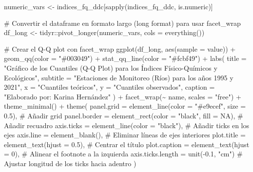 \documentclass[
  10pt,
  letterpaper,
  DIV=11,
  numbers=noendperiod]{scrreprt}
\newenvironment{Shaded}{\begin{snugshade}}{\end{snugshade}}
\newcommand{\AttributeTok}[1]{\textcolor[rgb]{0.40,0.45,0.13}{#1}}
\newcommand{\CommentTok}[1]{\textcolor[rgb]{0.37,0.37,0.37}{#1}}
\newcommand{\ConstantTok}[1]{\textcolor[rgb]{0.56,0.35,0.01}{#1}}
\newcommand{\DecValTok}[1]{\textcolor[rgb]{0.68,0.00,0.00}{#1}}
\newcommand{\FloatTok}[1]{\textcolor[rgb]{0.68,0.00,0.00}{#1}}
\newcommand{\FunctionTok}[1]{\textcolor[rgb]{0.28,0.35,0.67}{#1}}
\newcommand{\NormalTok}[1]{\textcolor[rgb]{0.00,0.23,0.31}{#1}}
\newcommand{\OtherTok}[1]{\textcolor[rgb]{0.00,0.23,0.31}{#1}}
\newcommand{\SpecialCharTok}[1]{\textcolor[rgb]{0.37,0.37,0.37}{#1}}
\newcommand{\StringTok}[1]{\textcolor[rgb]{0.13,0.47,0.30}{#1}}
\begin{document}
\begin{Shaded}
\begin{Highlighting}[numbers=left,,]
\NormalTok{numeric\_vars }\OtherTok{\textless{}{-}}\NormalTok{ indices\_fq\_ddc[}\FunctionTok{sapply}\NormalTok{(indices\_fq\_ddc, is.numeric)]}

\CommentTok{\# Convertir el dataframe en formato largo (long format) para usar facet\_wrap}
\NormalTok{df\_long }\OtherTok{\textless{}{-}}\NormalTok{ tidyr}\SpecialCharTok{::}\FunctionTok{pivot\_longer}\NormalTok{(numeric\_vars, }\AttributeTok{cols =} \FunctionTok{everything}\NormalTok{())}

\CommentTok{\# Crear el Q{-}Q plot con facet\_wrap}
\FunctionTok{ggplot}\NormalTok{(df\_long, }\FunctionTok{aes}\NormalTok{(}\AttributeTok{sample =}\NormalTok{ value)) }\SpecialCharTok{+}
    \FunctionTok{geom\_qq}\NormalTok{(}\AttributeTok{color =} \StringTok{"\#003049"}\NormalTok{) }\SpecialCharTok{+}
    \FunctionTok{stat\_qq\_line}\NormalTok{(}\AttributeTok{color =} \StringTok{"\#fcbf49"}\NormalTok{) }\SpecialCharTok{+}
    \FunctionTok{labs}\NormalTok{(}
        \AttributeTok{title =} \StringTok{"Gráfico de los Cuantiles (Q{-}Q Plot) para los Índices Físico{-}Químicos y Ecológicos"}\NormalTok{,}
        \AttributeTok{subtitle =} \StringTok{"Estaciones de Monitoreo (Ríos) para los años 1995 y 2021"}\NormalTok{,}
        \AttributeTok{x =} \StringTok{"Cuantiles teóricos"}\NormalTok{,}
        \AttributeTok{y =} \StringTok{"Cuantiles observados"}\NormalTok{,}
        \AttributeTok{caption =} \StringTok{"Elaborado por: Karina Hernández"}
\NormalTok{    ) }\SpecialCharTok{+}
    \FunctionTok{facet\_wrap}\NormalTok{(}\SpecialCharTok{\textasciitilde{}}\NormalTok{ name, }\AttributeTok{scales =} \StringTok{"free"}\NormalTok{) }\SpecialCharTok{+}
    \FunctionTok{theme\_minimal}\NormalTok{() }\SpecialCharTok{+}
    \FunctionTok{theme}\NormalTok{(}
        \AttributeTok{panel.grid =} \FunctionTok{element\_line}\NormalTok{(}\AttributeTok{color =} \StringTok{"\#e9ecef"}\NormalTok{, }\AttributeTok{size =} \FloatTok{0.5}\NormalTok{),  }\CommentTok{\# Añadir grid}
        \AttributeTok{panel.border =} \FunctionTok{element\_rect}\NormalTok{(}\AttributeTok{color =} \StringTok{"black"}\NormalTok{, }\AttributeTok{fill =} \ConstantTok{NA}\NormalTok{),  }\CommentTok{\# Añadir recuadro}
        \AttributeTok{axis.ticks =} \FunctionTok{element\_line}\NormalTok{(}\AttributeTok{color =} \StringTok{"black"}\NormalTok{),  }\CommentTok{\# Añadir ticks en los ejes}
        \AttributeTok{axis.line =} \FunctionTok{element\_blank}\NormalTok{(),  }\CommentTok{\# Eliminar líneas de ejes interiores}
        \AttributeTok{plot.title =} \FunctionTok{element\_text}\NormalTok{(}\AttributeTok{hjust =} \FloatTok{0.5}\NormalTok{),  }\CommentTok{\# Centrar el título}
        \AttributeTok{plot.caption =} \FunctionTok{element\_text}\NormalTok{(}\AttributeTok{hjust =} \DecValTok{0}\NormalTok{),  }\CommentTok{\# Alinear el footnote a la izquierda}
        \AttributeTok{axis.ticks.length =} \FunctionTok{unit}\NormalTok{(}\SpecialCharTok{{-}}\FloatTok{0.1}\NormalTok{, }\StringTok{"cm"}\NormalTok{)  }\CommentTok{\# Ajustar longitud de los ticks hacia adentro}
\NormalTok{    )}
\end{Highlighting}
\end{Shaded}
\end{document}
